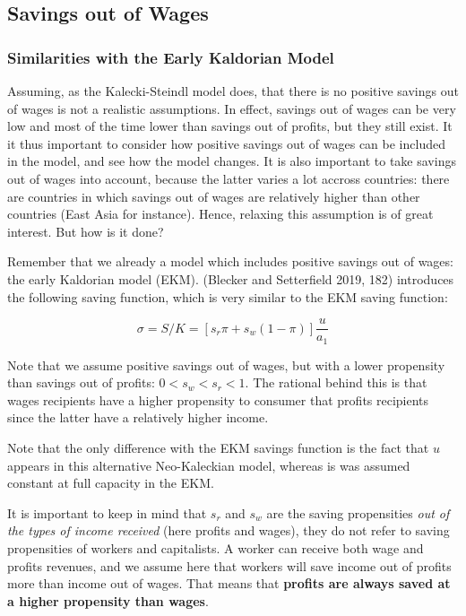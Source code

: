 \documentclass[
  letterpaper,
  DIV=11,
  numbers=noendperiod]{scrreprt}
\begin{document}
\hypertarget{savings-out-of-wages}{%
\subsection{Savings out of Wages}\label{savings-out-of-wages}}

\hypertarget{similarities-with-the-early-kaldorian-model}{%
\subsubsection{Similarities with the Early Kaldorian
Model}\label{similarities-with-the-early-kaldorian-model}}

Assuming, as the Kalecki-Steindl model does, that there is no positive
savings out of wages is not a realistic assumptions. In effect, savings
out of wages can be very low and most of the time lower than savings out
of profits, but they still exist. It it thus important to consider how
positive savings out of wages can be included in the model, and see how
the model changes. It is also important to take savings out of wages
into account, because the latter varies a lot accross countries: there
are countries in which savings out of wages are relatively higher than
other countries (East Asia for instance). Hence, relaxing this
assumption is of great interest. But how is it done?

Remember that we already a model which includes positive savings out of
wages: the early Kaldorian model (EKM). (Blecker and Setterfield 2019,
182) introduces the following saving function, which is very similar to
the EKM saving function:

\[\sigma = S/K = [s_r\pi+s_w(1-\pi)]\frac{u}{a_1}\]

Note that we assume positive savings out of wages, but with a lower
propensity than savings out of profits: \(0<s_w<s_r<1\). The rational
behind this is that wages recipients have a higher propensity to
consumer that profits recipients since the latter have a relatively
higher income.

Note that the only difference with the EKM savings function is the fact
that \(u\) appears in this alternative Neo-Kaleckian model, whereas is
was assumed constant at full capacity in the EKM.

It is important to keep in mind that \(s_r\) and \(s_w\) are the saving
propensities \emph{out of the types of income received} (here profits
and wages), they do not refer to saving propensities of workers and
capitalists. A worker can receive both wage and profits revenues, and we
assume here that workers will save income out of profits more than
income out of wages. That means that \textbf{profits are always saved at
a higher propensity than wages}.
\end{document}
